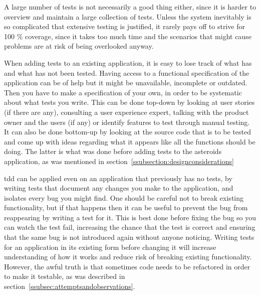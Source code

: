 \documentclass[11pt]{article}
\begin{document}
A large number of tests is not necessarily a good thing either, since it is harder to overview and maintain a large collection of tests. Unless the system inevitably is so complicated that extensive testing is justified, it rarely pays off to strive for 100 \% coverage, since it takes too much time and the scenarios that might cause problems are at risk of being overlooked anyway. \cite[question~28]{Edelstam}

When adding tests to an existing application, it is easy to lose track of what has and what has not been tested. Having access to a functional specification of the application can be of help but it might be unavailable, incomplete or outdated. Then you have to make a specification of your own, in order to be systematic about what tests you write. This can be done top-down by looking at user stories (if there are any), consulting a user experience expert, talking with the product owner and the users (if any) or identify features to test through manual testing. It can also be done bottom-up by looking at the source code that is to be tested and come up with ideas regarding what it appears like all the functions should be doing. The latter is what was done before adding tests to the asteroids application, as was mentioned in section~\ref{ssubsection:designconsiderations}

\gls{tdd} can be applied even on an application that previously has no tests, by writing tests that document any changes you make to the application, and isolates every bug you might find. One should be careful not to break existing functionality, but if that happens then it can be useful to prevent the bug from reappearing by writing a test for it. This is best done before fixing the bug so you can watch the test fail, increasing the chance that the test is correct and ensuring that the same bug is not introduced again without anyone noticing. Writing tests for an application in its existing form before changing it will increase understanding of how it works and reduce risk of breaking existing functionality. However, the awful truth is that sometimes code needs to be refactored in order to make it testable, as was described in section~\ref{ssubsec:attemptsandobservations}.
\end{document}
